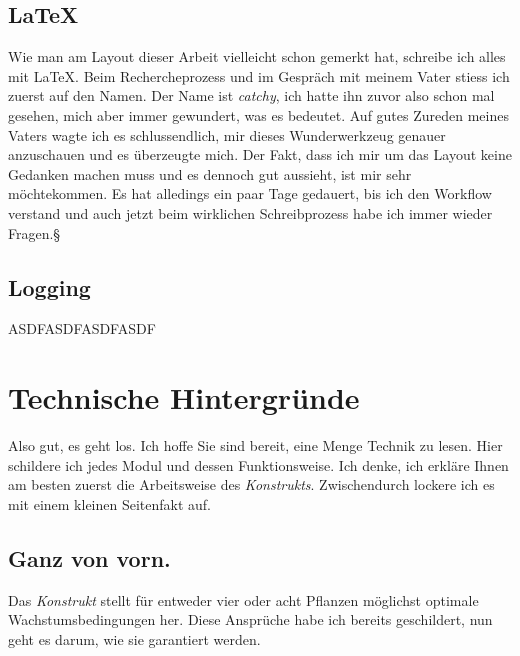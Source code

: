 \documentclass[12pt,titlepage,a4paper]{article}
\begin{document}
\subsection{LaTeX}
Wie man am Layout dieser Arbeit vielleicht schon gemerkt hat, schreibe ich alles mit LaTeX. Beim Rechercheprozess und im Gespräch mit meinem Vater stiess ich zuerst auf den Namen. Der Name ist \textit{catchy}, ich hatte ihn zuvor also schon mal gesehen, mich aber immer gewundert, was es bedeutet. Auf gutes Zureden meines Vaters wagte ich es schlussendlich, mir dieses Wunderwerkzeug genauer anzuschauen und es überzeugte mich. Der Fakt, dass ich mir um das Layout keine Gedanken machen muss und es dennoch gut aussieht, ist mir sehr möchtekommen. Es hat alledings ein paar Tage gedauert, bis ich den Workflow verstand und auch jetzt beim wirklichen Schreibprozess habe ich immer wieder Fragen.§

\subsection{Logging}
ASDFASDFASDFASDF


\section{Technische Hintergründe}
Also gut, es geht los. Ich hoffe Sie sind bereit, eine Menge Technik zu lesen. Hier schildere ich jedes Modul und dessen Funktionsweise. Ich denke, ich erkläre Ihnen am besten zuerst die Arbeitsweise des \textit{Konstrukts}. Zwischendurch lockere ich es mit einem kleinen Seitenfakt auf.
\subsection{Ganz von vorn.}
Das \textit{Konstrukt }stellt für entweder vier oder acht Pflanzen möglichst optimale Wachstumsbedingungen her. Diese Ansprüche habe ich bereits geschildert, nun geht es darum, wie sie garantiert werden.
\end{document}
